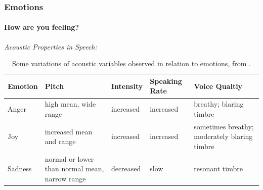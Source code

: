 \documentclass[10pt,usepdftitle=false,aspectratio=169]{beamer}
\begin{document}



\begin{frame}\frametitle{Emotions}
    \framesubtitle{How are you feeling?}
    


\vspace{2em}

\vspace{1em}
	\emph{Acoustic Properties in Speech:}

	\small
	\begin{table}
		\renewcommand{\arraystretch}{1.1}
		\centering
		\caption[]{Some variations of acoustic variables observed in relation to emotions, from \cite{vogt2008automatic}.}
		
		\begin{tabularx}{\textwidth}{YYYYY}
			\toprule
			\textbf{Emotion}&  \textbf{Pitch} &  \textbf{Intensity} &  \textbf{Speaking Rate}&\textbf{Voice Qualtiy}  \\
			\midrule
			Anger & high mean, wide range& increased& increased &breathy; blaring timbre \\
			Joy & increased mean and range & increased &increased &sometimes breathy; moderately blaring timbre\\
			Sadness & normal or lower than normal mean, narrow range & decreased & slow& resonant timbre  \\
			\bottomrule
		\end{tabularx}
	\end{table}
	
	

\end{frame}

\end{document}
